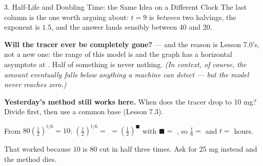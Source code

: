 \documentclass[10pt]{article}
\begin{document}
\begin{notesbox}{3. Half-Life and Doubling Time: the Same Idea on a Different Clock}
\vspace{2pt}
The last column is the one worth arguing about: $t=9$ is \emph{between} two halvings, the exponent is
$1.5$, and the answer lands sensibly between 40 and 20.

\vspace{3pt}
\textbf{Will the tracer ever be completely gone?} \blank{2.0cm} --- and the reason is Lesson 7.0's, not
a new one: the range of this model is \blank{2.2cm} and the graph has a horizontal asymptote at
\blank{1.6cm}. Half of something is never nothing. \emph{(In context, of course, the amount eventually
falls below anything a machine can detect --- but the model never reaches zero.)}

\vspace{4pt}
\begin{tcolorbox}[colback=greenbg, colframe=greenacc, boxrule=0.8pt, arc=1.5mm,
    left=2.5mm, right=2.5mm, top=1.5mm, bottom=1.5mm]
\textbf{Yesterday's method still works here.} When does the tracer drop to 10 mg? Divide first, then
use a common base (Lesson 7.3).

\vspace{3pt}
\hspace*{1.0em} From $80\left(\frac12\right)^{t/6}=10$: \quad
$\left(\frac12\right)^{t/6}=$ \blank{1.2cm} $=\left(\frac12\right)^{\blacksquare}$ with
$\blacksquare=$ \blank{0.9cm}, \quad so $\frac{t}{6}=$ \blank{0.9cm} \; and \; $t=$ \blank{1.4cm} hours.

\vspace{3pt}
That worked because $10$ is $80$ cut in half three times. Ask for 25 mg instead and the method dies.
\end{tcolorbox}
\end{notesbox}
\end{document}
